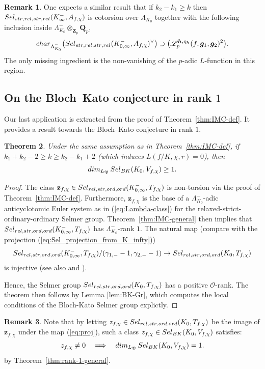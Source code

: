 \documentclass[10pt,letterpaper]{amsart}
\theoremstyle{plain}
\newtheorem{thm}{Theorem}[subsection] %
\theoremstyle{definition}
\newtheorem{rmk}[thm]{Remark}
\theoremstyle{definition}
\theoremstyle{plain}
\theoremstyle{plain}
\theoremstyle{plain}
\theoremstyle{remark}
\numberwithin{equation}{section}
\newcommand{\relstr}{{{\rm rel},{\rm str}}}
\newcommand{\strrel}{{{\rm str},{\rm rel}}}
\newcommand{\ord}{{{\rm ord},{\rm ord}}}
\def\cO{\mathcal O}
\newcommand{\Q}{\mathbf{Q}}
\newcommand{\Z}{\mathbf{Z}}
\newcommand{\bfg}{{\boldsymbol{g}}}
\newcommand{\bfh}{{\boldsymbol{h}}}
\begin{document}
\begin{rmk}One expects a similar result that if $k_2-k_1\ge k$ then ${\rm Sel}_{\strrel,\strrel}(K_\infty^-,A_{f,\chi})$ is cotorsion over $\Lambda_{K_0}^-$ together with the following inclusion inside $\Lambda_{K_0}^-\otimes_{\Z_p}\Q_p$,
\[
{\rm char}_{\Lambda_{K_0}^-}\bigl({\rm Sel}_{\strrel,\strrel}(K_{0,\infty}^-,A_{f,\chi})^\vee\bigr)\supset\bigl(\mathscr{L}_p^{\bfh,\eta_\bfh}(f,\bfg_1,\bfg_2)^2\bigr).
\]
The only missing ingredient is the non-vanishing of the $p$-adic $L$-function in this region.
    
\end{rmk}    
\subsection{On the Bloch--Kato conjecture in rank $1$} 

Our last application is extracted from the proof of Theorem~\ref{thm:IMC-def}. It provides a result towards the Bloch--Kato conjecture in rank $1$.

\begin{thm}\label{thm:BK-def-1}
Under the same assumption as in Theorem~\ref{thm:IMC-def}, if $k_1+k_2-2\geq k\ge k_2-k_1+2$ (which induces $L(f/K,\chi,r)=0$), then 
\[
{\rm dim}_{L_\mathfrak{P}}\,{\rm Sel}_{\rm BK}(K_0,V_{f,\chi})\geq 1.
\]

\end{thm}

\begin{proof}
 The class $\mathbf{z}_{f,\chi}\in{\rm Sel}_{\relstr,\ord}(K_{0,\infty}^-,T_{f,\chi})$ is non-torsion via the proof of Theorem~\ref{thm:IMC-def}. Furthermore, $\mathbf{z}_{f,\chi}$ is the base of a $\Lambda_{K_0}^-$-adic anticyclotomic Euler system as in (\ref{eq:Lambda-class}) for the relaxed-strict-ordinary-ordinary Selmer group. Theorem~\ref{thm:IMC-general} then implies that ${\rm Sel}_{\relstr,\ord}(K_{0,\infty}^-,T_{f,\chi})$ has $\Lambda_{K_0}^-$-rank $1$. The natural map (compare with the projection (\ref{eq:Sel_projection_from_K_infty}))
\begin{equation}\label{eq:proj}
{\rm Sel}_{\relstr,\ord}(K_{0,\infty}^-,T_{f,\chi})/(\gamma_{1,-}-1,\gamma_{2,-}-1)\rightarrow{\rm Sel}_{\relstr,\ord}(K_0,T_{f,\chi})
\end{equation}
is injective (see also \cite[Prop.\,5.3.14]{MR-KS} and \cite[p.\,72]{greenberg-cetraro}). 

Hence, the Selmer group ${\rm Sel}_{\relstr,\ord}(K_0,T_{f,\chi})$ has a positive $\cO$-rank. The theorem then follows by Lemma \ref{lem:BK-Gr}, which computes the local conditions of the Bloch-Kato Selmer group explictly. 
\end{proof}

\begin{rmk}
Note that by letting $z_{f,\chi}\in{\rm Sel}_{\relstr,\ord}(K_0,T_{f,\chi})$ be the image of $\mathbf{z}_{f,\chi}$ under the map (\ref{eq:proj}), such a class $z_{f,\chi}\in{\rm Sel}_{\rm BK}(K_0,V_{f,\chi})$ satisfies:
\[
z_{f,\chi}\neq 0\quad\Longrightarrow\quad{\rm dim}_{L_\mathfrak{P}}\,{\rm Sel}_{\rm BK}(K_0,V_{f,\chi})=1.
\]
by Theorem~\ref{thm:rank-1-general}.
\end{rmk}

\newpage


\end{document}
